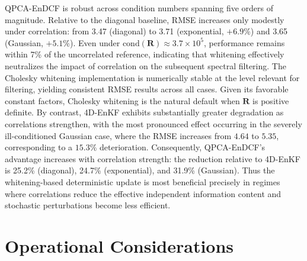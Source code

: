 \documentclass[11pt,a4paper]{article}
\begin{document}
QPCA-EnDCF is robust across condition numbers spanning five orders of magnitude. Relative to the diagonal baseline, RMSE increases only modestly under correlation: from 3.47 (diagonal) to 3.71 (exponential, $+6.9\%$) and 3.65 (Gaussian, $+5.1\%$). Even under $\mathrm{cond}(\mathbf{R})\approx 3.7\times10^5$, performance remains within 7\% of the uncorrelated reference, indicating that whitening effectively neutralizes the impact of correlation on the subsequent spectral filtering. The Cholesky whitening implementation is numerically stable at the level relevant for filtering, yielding consistent RMSE results across all cases. Given its favorable constant factors, Cholesky whitening is the natural default when $\mathbf{R}$ is positive definite. By contrast, 4D-EnKF exhibits substantially greater degradation as correlations strengthen, with the most pronounced effect occurring in the severely ill-conditioned Gaussian case, where the RMSE increases from $4.64$ to $5.35$, corresponding to a $15.3\%$ deterioration. Consequently, QPCA-EnDCF's advantage increases with correlation strength: the reduction relative to 4D-EnKF is 25.2\% (diagonal), 24.7\% (exponential), and 31.9\% (Gaussian). Thus the whitening-based deterministic update is most beneficial precisely in regimes where correlations reduce the effective independent information content and stochastic perturbations become less efficient.

\FloatBarrier










\section{Operational Considerations}
\label{sec:operational}
\end{document}
